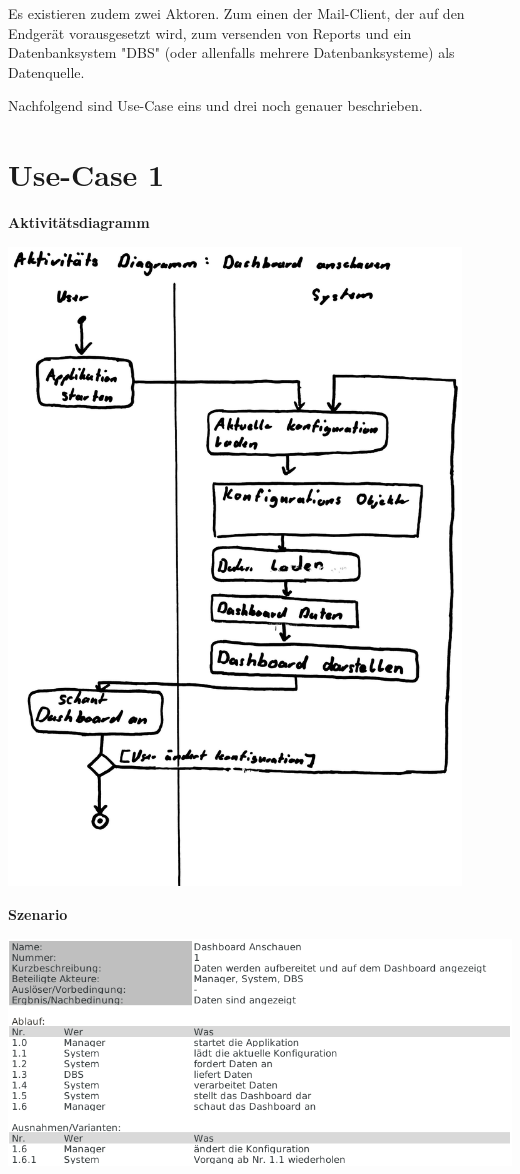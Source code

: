 \documentclass[a4paper]{scrreprt}
\begin{document}
Es existieren zudem zwei Aktoren. Zum einen der Mail-Client, der auf den Endgerät vorausgesetzt wird, zum versenden von Reports und ein Datenbanksystem "DBS" (oder allenfalls mehrere Datenbanksysteme) als Datenquelle.

\bigskip

Nachfolgend sind Use-Case eins und drei noch genauer beschrieben.


\pagebreak

\section{Use-Case 1}
\textbf{Aktivitätsdiagramm}

\includegraphics[width=0.9\textwidth]{uc-1_Dashboard/uc1_activity.jpg}


\pagebreak


\textbf{Szenario}

\includegraphics[width=1\textwidth]{uc-1_Dashboard/uc1_scenario.png}
\end{document}
